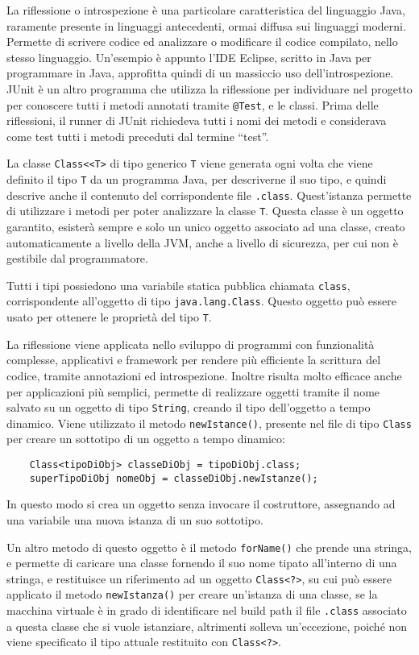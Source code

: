\documentclass{article}
\numberwithin{equation}{subsection}
\begin{document}
La riflessione o introspezione è una particolare caratteristica del linguaggio Java, raramente presente in linguaggi antecedenti, ormai diffusa sui linguaggi moderni. 
Permette di scrivere codice ed analizzare o modificare il codice compilato, nello stesso linguaggio. Un'esempio è appunto l'IDE Eclipse, scritto in Java per programmare in 
Java, approfitta quindi di un massiccio uso dell'introspezione. 
JUnit è un altro programma che utilizza la riflessione per individuare nel progetto per conoscere tutti i metodi annotati tramite \verb|@Test|, e le classi. Prima delle 
riflessioni, il runner di JUnit richiedeva tutti i nomi dei metodi e considerava come test tutti i metodi preceduti dal termine ``test''. 


La classe \verb|Class<<T>| di tipo generico \verb|T| viene generata ogni volta che viene definito il tipo \verb|T| da un programma Java, per descriverne il suo tipo, e quindi 
descrive anche il contenuto del corrispondente file \verb|.class|. 
Quest'istanza permette di utilizzare i metodi per poter analizzare la classe \verb|T|. 
Questa classe è un oggetto garantito, esisterà sempre e solo un unico oggetto associato ad una classe, creato automaticamente a livello della JVM, anche a livello di sicurezza, 
per cui non è gestibile dal programmatore. 


Tutti i tipi possiedono una variabile statica pubblica chiamata \verb|class|, corrispondente all'oggetto di tipo \verb|java.lang.Class|. 
Questo oggetto può essere usato per ottenere le proprietà del tipo \verb|T|. 


La riflessione viene applicata nello sviluppo di programmi con funzionalità complesse, applicativi e framework per rendere più efficiente la scrittura del codice, tramite 
annotazioni ed introspezione. 
Inoltre risulta molto efficace anche per applicazioni più semplici, permette di realizzare oggetti tramite il nome salvato su un oggetto di tipo \verb|String|, 
creando il tipo dell'oggetto a tempo dinamico. Viene utilizzato il metodo \verb|newIstance()|, presente nel file di tipo \verb|Class| per creare un sottotipo di un 
oggetto a tempo dinamico: 
\begin{verbatim}
    Class<tipoDiObj> classeDiObj = tipoDiObj.class;
    superTipoDiObj nomeObj = classeDiObj.newIstanze(); 
\end{verbatim}
In questo modo si crea un oggetto senza invocare il costruttore, assegnando ad una variabile una nuova istanza di un suo sottotipo. 

Un altro metodo di questo oggetto è il metodo \verb|forName()| che prende una stringa, e permette di caricare una classe fornendo il suo nome tipato all'interno di una stringa, 
e restituisce un riferimento ad un oggetto \verb|Class<?>|, su cui può essere applicato il metodo \verb|newIstanza()| per creare un'istanza di una classe, se la macchina virtuale 
è in grado di identificare nel build path il file \verb|.class| associato a questa classe che si vuole istanziare, altrimenti solleva un'eccezione, poiché non viene specificato il 
tipo attuale restituito con \verb|Class<?>|. 
\end{document}
